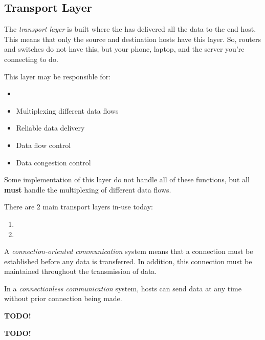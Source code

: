 \subsection{Transport Layer}\label{subsec:Transport_Layer}
\begin{definition}\label{def:Transport_Layer}
  The \emph{transport layer} is built where the  has delivered all the data to the end host.
  This means that only the source and destination hosts have this layer.
  So, routers and switches do not have this, but your phone, laptop, and the server you're connecting to do.
  
  This layer may be responsible for:
  \begin{itemize}[noitemsep]
  \item {}
  \item Multiplexing different data flows
  \item Reliable data delivery
  \item Data flow control
  \item Data congestion control
  \end{itemize}
  Some implementation of this layer do not handle all of these functions, but all \textbf{must} handle the multiplexing of different data flows.

  There are 2 main transport layers in-use today:
  \begin{enumerate}[noitemsep]
  \item {}
  \item {}
  \end{enumerate}
\end{definition}

\begin{definition}\label{def:Connection_Oriented_Communication}
  A \emph{connection-oriented communication} system means that a connection must be established before any data is transferred.
  In addition, this connection must be maintained throughout the transmission of data.

  \begin{remark}\label{rmk:Connectionless_Communication}
    In a \emph{connectionless communication} system, hosts can send data at any time without prior connection being made.
  \end{remark}
\end{definition}

\begin{definition}\label{def:Transmission_Control_Protocol}
  \textbf{TODO!}
\end{definition}

\begin{definition}\label{def:User_Datagram_Protocol}
  \textbf{TODO!}
\end{definition}

